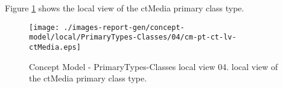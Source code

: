Figure \ref{fig:lu.uni.lassy.excalibur.icrash-spec-CM-view-local-PrimaryTypes-Classes-04} shows the local view of the ctMedia primary class type.



\begin{figure}[htbp] 
\label{fig:lu.uni.lassy.excalibur.icrash-spec-CM}
\begin{center}
\texttt{[image: ./images-report-gen/concept-model/local/PrimaryTypes-Classes/04/cm-pt-ct-lv-ctMedia.eps]}
\end{center}
\caption[Concept Model - PrimaryTypes-Classes local view 04 - local view of the ctMedia primary cl]{Concept Model - PrimaryTypes-Classes local view 04. local view of the ctMedia primary class type.}
\label{fig:lu.uni.lassy.excalibur.icrash-spec-CM-view-local-PrimaryTypes-Classes-04}
\end{figure}
\vspace{0.5cm} 
